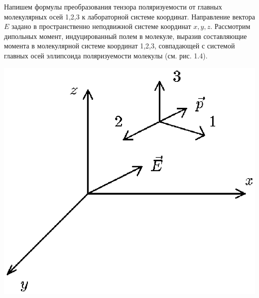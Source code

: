Напишем формулы преобразования тензора поляризуемости от главных
молекулярных осей 1,2,3 к лабораторной системе координат.
Направление вектора $E$ задано в пространственно неподвижной
системе координат $x,y,z$. Рассмотрим дипольных момент,
индуцированный полем в молекуле, выразив составляющие момента в
молекулярной системе координат 1,2,3, совпадающей с системой
главных осей эллипсоида поляризуемости молекулы (см. рис. 1.4).

\vskip 3mm
\centerline{\hbox{\includegraphics[scale=0.7]{Ris/ris_eps/ris1_04.eps}}}

